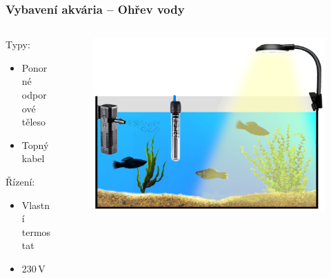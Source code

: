 \documentclass[%
  12pt,       				%
	t,                  %
	aspectratio=1610,   %
	unicode,						%
]{beamer}				    	%
\begin{document}
\begin{frame} 
	\frametitle{Vybavení akvária -- Ohřev vody}
	
	\begin{columns}[T] 								%
		\begin{column}{0.4\textwidth}		%
			Typy:\\[2ex]
			\begin{itemize}
				\item Ponorné odporové těleso
				\item Topný kabel
			\end{itemize}

			\vspace{4ex}%
			Řízení:\\[2ex]
			\begin{itemize}
				\item Vlastní termostat 
				\item 230\,V
			\end{itemize}
		\end{column}
		\begin{column}{0.6\textwidth}		%
			\begin{figure}%
				\centering
				\includegraphics[width=\columnwidth]{obrazky/prezentace/vybaveni-akvaria/05-topeni.png}
			\end{figure}
		\end{column}
	\end{columns}											%
\end{frame}
\end{document}
